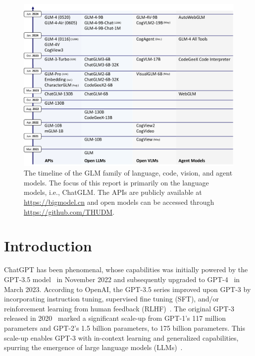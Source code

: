 
 


\begin{figure}[tb]
    \centering
    \includegraphics[width=\linewidth]{figs/glm4-history6.pdf}
    \caption{The timeline of the GLM family of language, code, vision, and agent models. The focus of this report is primarily on the language models, i.e., ChatGLM. The APIs are publicly available at \url{https://bigmodel.cn} and open models can be accessed through \url{https://github.com/THUDM}.}
    \label{fig:timeline}
\end{figure}

\section{Introduction}

ChatGPT has been phenomenal, whose capabilities was initially powered by the GPT-3.5 model~\cite{chatgpt} in November 2022 and subsequently upgraded to GPT-4~\cite{openai2023gpt} in March 2023. 
According to OpenAI, the GPT-3.5 series improved upon GPT-3 by incorporating instruction tuning, supervised fine tuning (SFT), and/or reinforcement learning from human feedback (RLHF)~\cite{ouyang2022training}. 
The original GPT-3 released in 2020~\cite{GPT3} marked a significant scale-up from GPT-1's 117 million parameters and GPT-2's 1.5 billion parameters, to 175 billion parameters. 
This scale-up enables GPT-3 with in-context learning and generalized capabilities, spurring the emergence of large language models (LLMs)~\cite{chowdhery2022palm,touvron2023llama}. 

